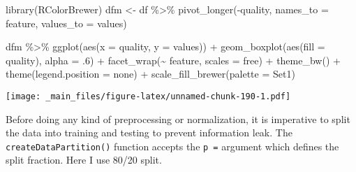 \documentclass[
]{book}
\newenvironment{Shaded}{\begin{snugshade}}{\end{snugshade}}
\newcommand{\AttributeTok}[1]{\textcolor[rgb]{0.77,0.63,0.00}{#1}}
\newcommand{\DecValTok}[1]{\textcolor[rgb]{0.00,0.00,0.81}{#1}}
\newcommand{\FunctionTok}[1]{\textcolor[rgb]{0.00,0.00,0.00}{#1}}
\newcommand{\NormalTok}[1]{#1}
\newcommand{\OtherTok}[1]{\textcolor[rgb]{0.56,0.35,0.01}{#1}}
\newcommand{\SpecialCharTok}[1]{\textcolor[rgb]{0.00,0.00,0.00}{#1}}
\newcommand{\StringTok}[1]{\textcolor[rgb]{0.31,0.60,0.02}{#1}}
\begin{document}
\begin{Shaded}
\begin{Highlighting}[]
\FunctionTok{library}\NormalTok{(RColorBrewer)}
\NormalTok{dfm }\OtherTok{\textless{}{-}}\NormalTok{ df }\SpecialCharTok{\%\textgreater{}\%} \FunctionTok{pivot\_longer}\NormalTok{(}\SpecialCharTok{{-}}\NormalTok{quality, }\AttributeTok{names\_to =} \StringTok{\textquotesingle{}feature\textquotesingle{}}\NormalTok{, }
               \AttributeTok{values\_to =} \StringTok{\textquotesingle{}values\textquotesingle{}}\NormalTok{)}

\NormalTok{dfm }\SpecialCharTok{\%\textgreater{}\%} \FunctionTok{ggplot}\NormalTok{(}\FunctionTok{aes}\NormalTok{(}\AttributeTok{x =}\NormalTok{ quality, }\AttributeTok{y =}\NormalTok{ values)) }\SpecialCharTok{+} 
  \FunctionTok{geom\_boxplot}\NormalTok{(}\FunctionTok{aes}\NormalTok{(}\AttributeTok{fill =}\NormalTok{ quality), }\AttributeTok{alpha =}\NormalTok{ .}\DecValTok{6}\NormalTok{) }\SpecialCharTok{+} 
  \FunctionTok{facet\_wrap}\NormalTok{(}\SpecialCharTok{\textasciitilde{}}\NormalTok{ feature, }\AttributeTok{scales =} \StringTok{\textquotesingle{}free\textquotesingle{}}\NormalTok{) }\SpecialCharTok{+} \FunctionTok{theme\_bw}\NormalTok{() }\SpecialCharTok{+} 
  \FunctionTok{theme}\NormalTok{(}\AttributeTok{legend.position =} \StringTok{\textquotesingle{}none\textquotesingle{}}\NormalTok{) }\SpecialCharTok{+} 
  \FunctionTok{scale\_fill\_brewer}\NormalTok{(}\AttributeTok{palette =} \StringTok{\textquotesingle{}Set1\textquotesingle{}}\NormalTok{)}
\end{Highlighting}
\end{Shaded}

\texttt{[image: \_main\_files/figure-latex/unnamed-chunk-190-1.pdf]}

Before doing any kind of preprocessing or normalization, it is imperative to split the data into training and testing to prevent information leak. The \texttt{createDataPartition()} function accepts the \texttt{p\ =} argument which defines the split fraction. Here I use 80/20 split.
\end{document}
